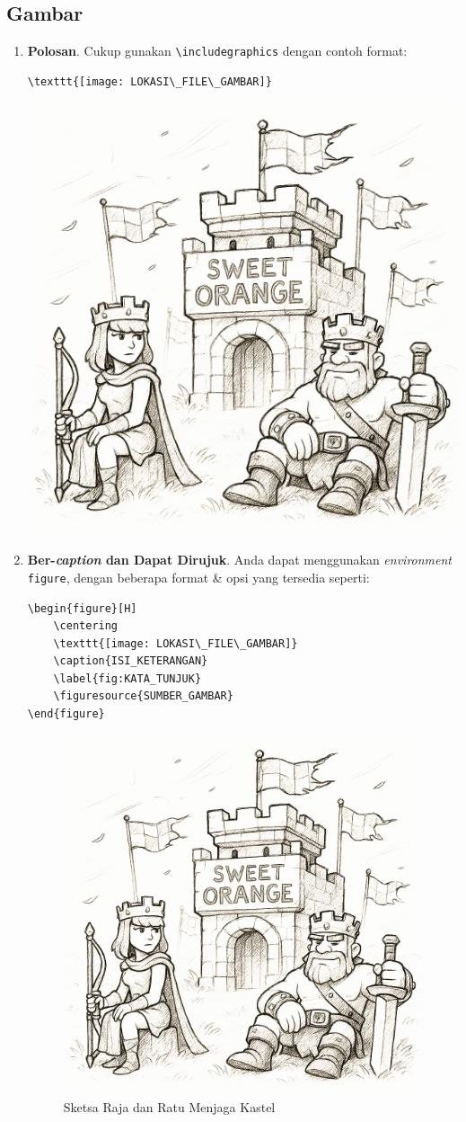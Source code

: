 \subsection{Gambar}

\begin{enumerate}[]
    \item \textbf{Polosan}. Cukup gunakan \verb|\includegraphics| dengan contoh format:
    \begin{lstlisting}
\texttt{[image: LOKASI\_FILE\_GAMBAR]}
    \end{lstlisting}
    
    \begin{center}
        \includegraphics[width=.5\linewidth]{image/Sweet Orange Castle.jpg}
    \end{center}
    
    \item \textbf{Ber-\textit{caption} dan Dapat Dirujuk}. Anda dapat menggunakan \textit{environment} \texttt{figure}, dengan beberapa format \& opsi yang tersedia seperti:
    \begin{lstlisting}
\begin{figure}[H]
    \centering
    \texttt{[image: LOKASI\_FILE\_GAMBAR]}
    \caption{ISI_KETERANGAN}
    \label{fig:KATA_TUNJUK}
    \figuresource{SUMBER_GAMBAR}
\end{figure}
    \end{lstlisting}
    
    \begin{figure}[H]
        \centering
        \includegraphics[width=.5\linewidth]{image/Sweet Orange Castle.jpg}
        \caption{Sketsa Raja dan Ratu Menjaga Kastel}
        \label{fig:sketsa-kastel}
    \end{figure}
    

\end{enumerate}
